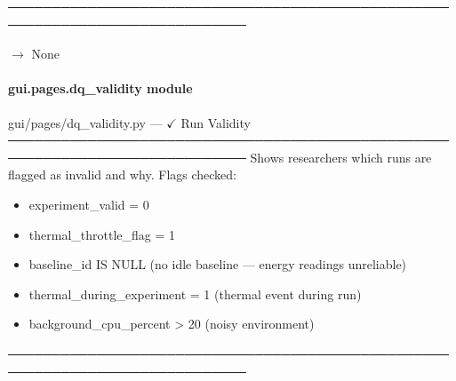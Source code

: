 \documentclass[letterpaper,10pt,english]{sphinxmanual}
\begin{document}
\sphinxAtStartPar
─────────────────────────────────────────────────────────────────────────────

\begin{fulllineitems}
\label{\detokenize{gui.pages.dq_sufficiency:gui.pages.dq_sufficiency.render}}
\pysigstartsignatures
\pysiglinewithargsret
{}
{}
{{ $\rightarrow$ None}}
\pysigstopsignatures
\end{fulllineitems}


\sphinxstepscope


\paragraph{gui.pages.dq\_validity module}
\label{\detokenize{gui.pages.dq_validity:module-gui.pages.dq_validity}}\label{\detokenize{gui.pages.dq_validity:gui-pages-dq-validity-module}}\label{\detokenize{gui.pages.dq_validity::doc}}
\sphinxAtStartPar
gui/pages/dq\_validity.py  —  \(\checkmark\)  Run Validity
─────────────────────────────────────────────────────────────────────────────
Shows researchers which runs are flagged as invalid and why.
Flags checked:
\begin{itemize}
\item {} 
\sphinxAtStartPar
experiment\_valid = 0

\item {} 
\sphinxAtStartPar
thermal\_throttle\_flag = 1

\item {} 
\sphinxAtStartPar
baseline\_id IS NULL (no idle baseline — energy readings unreliable)

\item {} 
\sphinxAtStartPar
thermal\_during\_experiment = 1 (thermal event during run)

\item {} 
\sphinxAtStartPar
background\_cpu\_percent \textgreater{} 20 (noisy environment)

\end{itemize}

\sphinxAtStartPar
─────────────────────────────────────────────────────────────────────────────
\end{document}
